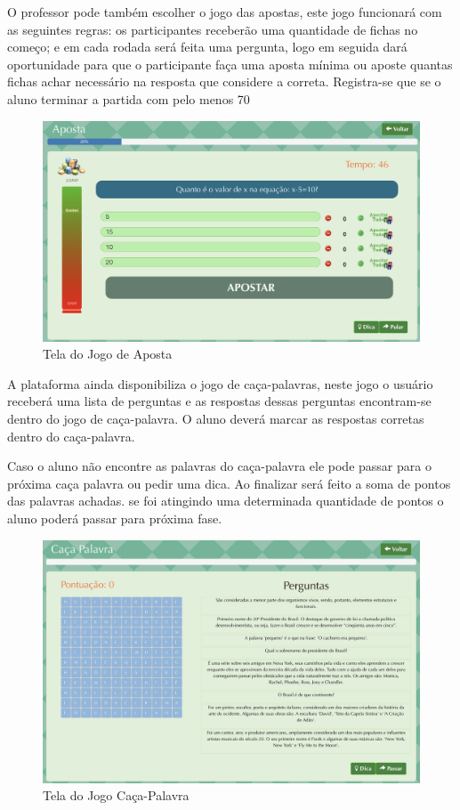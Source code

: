O professor pode também escolher o jogo das apostas, este jogo funcionará com as seguintes regras: os participantes receberão uma quantidade de fichas no começo; e em cada rodada será feita uma pergunta, logo em seguida dará oportunidade para que o participante faça uma aposta mínima ou aposte quantas fichas achar necessário na resposta que considere a correta. Registra-se que se o aluno terminar a partida com pelo menos 70%

\begin{figure}[H]
  \centering
  \includegraphics[scale=0.25]{images/proposta-img/Figura4-24.png}
  \caption{Tela do Jogo de Aposta}
  \label{fig:Figura4-24}
\end{figure}

A plataforma ainda disponibiliza o jogo de caça-palavras, neste jogo o usuário receberá uma lista de perguntas e as respostas dessas perguntas encontram-se dentro do jogo de caça-palavra. O aluno deverá marcar as respostas corretas dentro do caça-palavra.

Caso o aluno não encontre as palavras do caça-palavra ele pode passar para o próxima caça palavra ou pedir uma dica. Ao finalizar será feito a soma de pontos das palavras achadas. se foi atingindo uma determinada quantidade de pontos o aluno poderá passar para próxima fase.

\begin{figure}[H]
  \centering
  \includegraphics[scale=0.25]{images/proposta-img/Figura4-25.png}
  \caption{Tela do Jogo Caça-Palavra}
  \label{fig:Figura4-25}
\end{figure}


